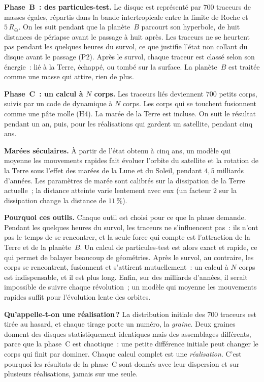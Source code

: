 \documentclass[11pt,a4paper]{article}
\newcommand{\Rt}{\ensuremath{R_\oplus}}
\begin{document}
\textbf{Phase~B~: des particules-test.} Le disque est représenté par $700$ traceurs de masses égales, répartis dans la bande intertropicale entre la limite de Roche et $5\,\Rt$. On les suit pendant que la planète~$B$ parcourt son hyperbole, de huit distances de périapse avant le passage à huit après. Les traceurs ne se heurtent pas pendant les quelques heures du survol, ce que justifie l'état non collant du disque avant le passage (P2). Après le survol, chaque traceur est classé selon son énergie~: lié à la Terre, échappé, ou tombé sur la surface. La planète~$B$ est traitée comme une masse qui attire, rien de plus.

\textbf{Phase~C~: un calcul à $N$ corps.} Les traceurs liés deviennent $700$ petits corps, suivis par un code de dynamique à $N$ corps. Les corps qui se touchent fusionnent comme une pâte molle (H4). La marée de la Terre est incluse. On suit le résultat pendant un an, puis, pour les réalisations qui gardent un satellite, pendant cinq ans.

\textbf{Marées séculaires.} À partir de l'état obtenu à cinq ans, un modèle qui moyenne les mouvements rapides fait évoluer l'orbite du satellite et la rotation de la Terre sous l'effet des marées de la Lune et du Soleil, pendant $4{,}5$ milliards d'années. Les paramètres de marée sont calibrés sur la dissipation de la Terre actuelle~; la distance atteinte varie lentement avec eux (un facteur $2$ sur la dissipation change la distance de $11\,\%$).

\textbf{Pourquoi ces outils.} Chaque outil est choisi pour ce que la phase demande. Pendant les quelques heures du survol, les traceurs ne s'influencent pas~: ils n'ont pas le temps de se rencontrer, et la seule force qui compte est l'attraction de la Terre et de la planète~$B$. Un calcul de particules-test est alors exact et rapide, ce qui permet de balayer beaucoup de géométries. Après le survol, au contraire, les corps se rencontrent, fusionnent et s'attirent mutuellement~: un calcul à $N$ corps est indispensable, et il est plus long. Enfin, sur des milliards d'années, il serait impossible de suivre chaque révolution~; un modèle qui moyenne les mouvements rapides suffit pour l'évolution lente des orbites.

\textbf{Qu'appelle-t-on une réalisation\,?} La distribution initiale des $700$ traceurs est tirée au hasard, et chaque tirage porte un numéro, la \emph{graine}. Deux graines donnent des disques statistiquement identiques mais des assemblages différents, parce que la phase~C est chaotique~: une petite différence initiale peut changer le corps qui finit par dominer. Chaque calcul complet est une \emph{réalisation}. C'est pourquoi les résultats de la phase~C sont donnés avec leur dispersion et sur plusieurs réalisations, jamais sur une seule.
\end{document}
